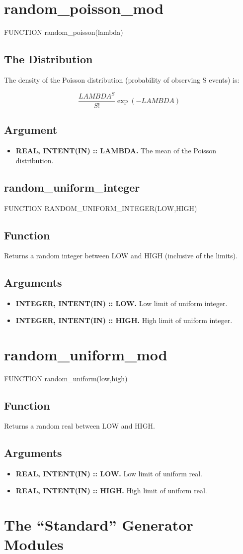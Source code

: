 \documentclass[12pt,dvips]{article}
\newcommand{\mysection}[1]{\color{blue}
            \section{#1} \normalcolor}
\newcommand{\mysubsection}[1] {\color{green}
            \subsection{#1} \normalcolor}
\newcommand{\myitem}[1]{\item{\bf \color{Violet} #1 \normalcolor}}
\begin{document}
\mysection{random\_poisson\_mod}

FUNCTION random\_poisson(lambda)

\mysubsection{The Distribution}

The density of the Poisson distribution (probability of observing S
events) is:

\[ \frac{LAMBDA^S}{S!} \exp(-LAMBDA) \]

\mysubsection{Argument}

\begin{itemize}

\myitem{REAL, INTENT(IN) :: LAMBDA.} The mean of the Poisson
distribution.

\end{itemize}

\pagebreak

\mysubsection{random\_uniform\_integer}

FUNCTION RANDOM\_UNIFORM\_INTEGER(LOW,HIGH)

\mysubsection{Function}

Returns a random integer between LOW and HIGH (inclusive of the limits).

\mysubsection{Arguments}

\begin{itemize}

\myitem{INTEGER, INTENT(IN) :: LOW.}  Low limit of uniform integer.

\myitem{INTEGER, INTENT(IN) :: HIGH.}  High limit of uniform integer.

\end{itemize}

\pagebreak

\mysection{random\_uniform\_mod}

FUNCTION random\_uniform(low,high)

\mysubsection{Function}

Returns a random real between LOW and HIGH.

\mysubsection{Arguments}

\begin{itemize}

\myitem{REAL, INTENT(IN) :: LOW.}  Low limit of uniform real.

\myitem{REAL, INTENT(IN) :: HIGH.}  High limit of uniform real.

\end{itemize}

\pagebreak

\mysection{The ``Standard'' Generator Modules}
\end{document}
